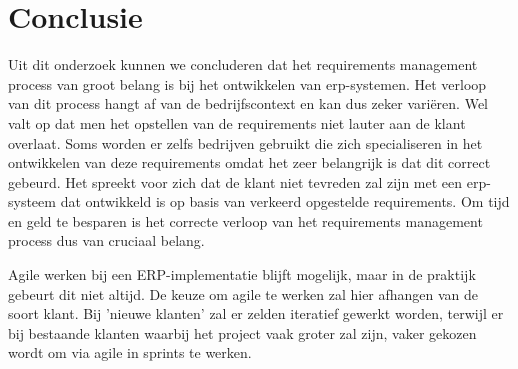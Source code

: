 
\chapter{Conclusie}
\label{ch:conclusie}

Uit dit onderzoek kunnen we concluderen dat het requirements management process van groot belang is bij het ontwikkelen van erp-systemen. Het verloop van dit process hangt af van de bedrijfscontext en kan dus zeker variëren. Wel valt op dat men het opstellen van de requirements niet lauter aan de klant overlaat. Soms worden er zelfs bedrijven gebruikt die zich specialiseren in het ontwikkelen van deze requirements omdat het zeer belangrijk is dat dit correct gebeurd. Het spreekt voor zich dat de klant niet tevreden zal zijn met een erp-systeem dat ontwikkeld is op basis van verkeerd opgestelde requirements. Om tijd en geld te besparen is het correcte verloop van het requirements management process dus van cruciaal belang. 

Agile werken bij een ERP-implementatie blijft mogelijk, maar in de praktijk gebeurt dit niet altijd. De keuze om agile te werken zal hier afhangen van de soort klant. Bij 'nieuwe klanten' zal er zelden iteratief gewerkt worden, terwijl er bij bestaande klanten waarbij het project vaak groter zal zijn, vaker gekozen wordt om via agile in sprints te werken.